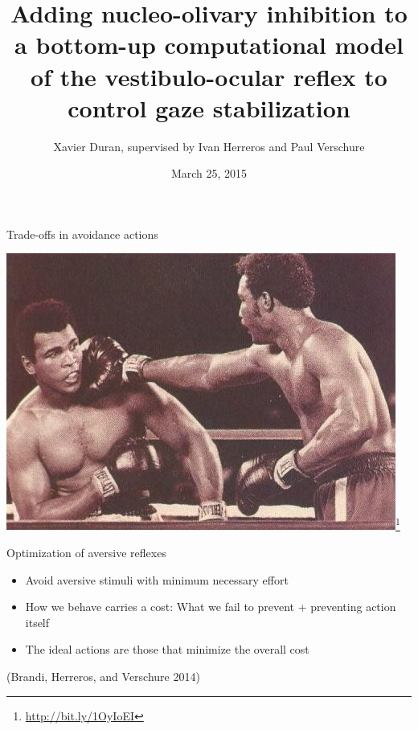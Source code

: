 \documentclass[ignorenonframetext,]{beamer}
\title{Adding nucleo-olivary inhibition to a bottom-up computational model of
the vestibulo-ocular reflex to control gaze stabilization}
\author{Xavier Duran, supervised by Ivan Herreros and Paul Verschure}
\date{March 25, 2015}
\begin{document}
\frame{\titlepage}

\begin{frame}{Trade-offs in avoidance actions}

\includegraphics{images/ali.png}\footnote{\url{http://bit.ly/1OyIoEI}}

\end{frame}

\begin{frame}{Optimization of aversive reflexes}

\begin{itemize}
\itemsep1pt\parskip0pt
\item
  Avoid aversive stimuli with minimum necessary effort
\item
  How we behave carries a cost: What we fail to prevent + preventing
  action itself
\item
  The ideal actions are those that minimize the overall cost
\end{itemize}

(Brandi, Herreros, and Verschure 2014)

\end{frame}
\end{document}
